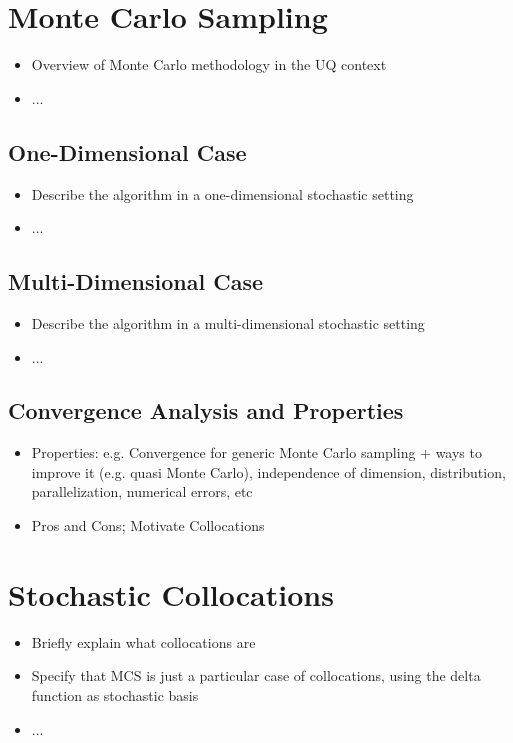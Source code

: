 \section{Monte Carlo Sampling}
\label{sec:Monte Carlo Sampling}
\begin{itemize}
\item Overview of Monte Carlo methodology in the UQ context
\item ...
\end{itemize}	
\subsection{One-Dimensional Case}
\label{subsec:One-Dimensional Case}
\begin{itemize}
\item Describe the algorithm in a one-dimensional stochastic setting
\item ...
\end{itemize}	
\subsection{Multi-Dimensional Case}
\label{subsec:Multi-Dimensional Case}
\begin{itemize}
\item Describe the algorithm in a multi-dimensional stochastic setting
\item ...
\end{itemize}
\subsection{Convergence Analysis and Properties}
\label{subsec:Convergence Analysis and Properties}
\begin{itemize}
\item Properties: e.g. Convergence for generic Monte Carlo sampling + ways to improve it (e.g. quasi Monte Carlo), independence of dimension, distribution, parallelization, numerical errors, etc
\item Pros and Cons; Motivate Collocations
\end{itemize}	
\section{Stochastic Collocations}
\label{sec:Stochastic Collocations}
\begin{itemize}
\item Briefly explain what collocations are
\item Specify that MCS is just a particular case of collocations, using the delta function as stochastic basis
\item ...
\end{itemize}
